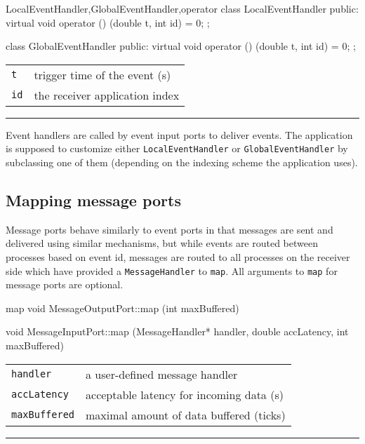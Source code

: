 \documentclass[a4paper,twoside]{report}
\makeatletter
\newenvironment{parameters}%
{\begin{tabular}{@{\hspace{2em}}lp{0.6\textwidth}}}%
{\end{tabular}\par\vspace{1mm}\par\hrule\par\vspace{5mm}}
\makeatother
\begin{document}
\begin{head}{LocalEventHandler,GlobalEventHandler,operator}
  class LocalEventHandler {
  public:
    virtual void operator () (double t, int id) = 0;
  };

  class GlobalEventHandler {
  public:
    virtual void operator () (double t, int id) = 0;
  };
\end{head}
\begin{parameters}
  \lstinline|t| & trigger time of the event (s) \\
  \lstinline|id| & the receiver application index \\
\end{parameters}

Event handlers are called by event input ports to deliver events.  The
application is supposed to customize either
\lstinline|LocalEventHandler| or \lstinline|GlobalEventHandler| by
subclassing one of them (depending on the indexing
scheme the application uses).


\subsection{Mapping message ports}

Message ports behave similarly to event ports in that messages are
sent and delivered using similar mechanisms, but while events are
routed between processes based on event id, messages are routed to all
processes on the receiver side which have provided a
\lstinline|MessageHandler| to \lstinline|map|.  All arguments to
\lstinline|map| for message ports are optional.

\begin{head}{map}
  void MessageOutputPort::map (int maxBuffered)

  void MessageInputPort::map (MessageHandler* handler,
                              double accLatency,
                              int maxBuffered)
\end{head}
\begin{parameters}
  \lstinline|handler| & a user-defined message handler \\
  \lstinline|accLatency| & acceptable latency for incoming data (s) \\
  \lstinline|maxBuffered| & maximal amount of data buffered (ticks) \\
\end{parameters}


\pagebreak
\end{document}
